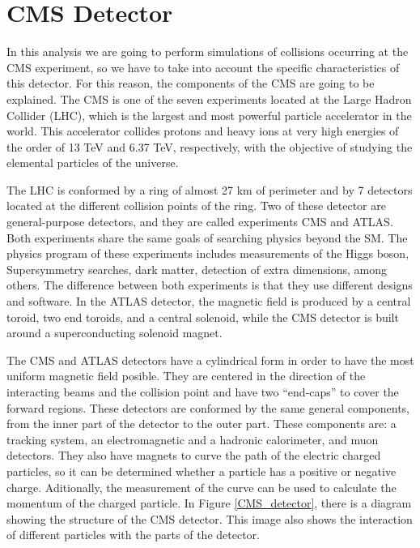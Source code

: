 \chapter{CMS Detector}
\label{CMS_chapter}

In this analysis we are going to perform simulations of collisions occurring at the CMS experiment, so we have to take into account the specific characteristics of this detector. For this reason,
the components of the CMS are going to be explained.
The CMS is one of the seven experiments located at the Large Hadron Collider (LHC), which is the largest and most powerful particle accelerator in the world. This accelerator collides protons 
and heavy ions at very high energies of the order of 13 TeV and 6.37 TeV, respectively, with the objective of studying the elemental particles of the universe. 


The LHC is conformed by a ring of almost 27 km of perimeter and by 7 detectors located at the different collision points of the ring. Two of these detector are general-purpose detectors, and they 
are called experiments CMS and ATLAS. Both experiments share the same goals of searching physics beyond the SM. The physics program of these experiments includes measurements of the Higgs boson, 
Supersymmetry searches, dark matter, detection of extra dimensions, among others. The difference between both experiments is that they use different designs and software. In the ATLAS detector, the 
magnetic field is produced by a central toroid, two end toroids, and a central solenoid, while the CMS detector is built around a superconducting solenoid magnet.  

The CMS and ATLAS detectors have a cylindrical form in order to have the most uniform magnetic field posible. They are centered in the direction of the interacting beams and the collision point and have two ``end-caps'' to cover the forward regions. These detectors are conformed by the same general components, from the inner part of the detector to the outer part. These components are: a tracking system, an electromagnetic and a hadronic calorimeter, and muon detectors. They also have magnets to curve the path of the electric charged particles, so it can be determined whether a particle has a positive or negative charge. Aditionally, the measurement of the curve can be used to calculate the momentum of the charged particle. In Figure \ref{CMS_detector}, there is a diagram showing the structure of the CMS detector. This image also shows the interaction of different particles with the parts of the detector.

